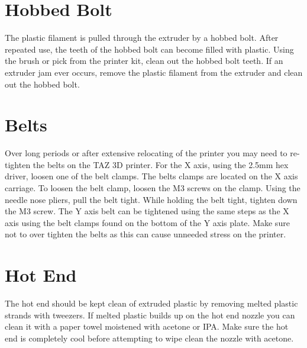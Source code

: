 \section{Hobbed Bolt}
The plastic filament is pulled through the extruder by a hobbed bolt. After repeated use, the teeth of the hobbed bolt can become filled with plastic. Using the brush or pick from the printer kit, clean out the hobbed bolt teeth. If an extruder jam ever occurs, remove the plastic filament from the extruder and clean out the hobbed bolt.

\begin{comment}
\section{Software}
\index{software}
\index{download}
LulzBot will release a new stable version of Cura LulzBot Edition, typically every quarter. It is best to update Cura every time a new version is released. The printer host and slicing software is as important as the hardware in printing quality parts. Each software update can bring advances in print quality, reliability and print times. The files are available at \texttt{http://lulzbot.com/cura}. You can also find updated software versions in the Support/Downloads section at: \texttt{http://LulzBot.com/downloads}.
\end{comment}

\section{Belts}
Over long periods or after extensive relocating of the printer you may need to re-tighten the belts on the TAZ 3D printer. For the X axis, using the 2.5mm hex driver, loosen one of the belt clamps. The belts clamps are located on the X axis carriage. To loosen the belt clamp, loosen the M3 screws on the clamp. Using the needle nose pliers, pull the belt tight. While holding the belt tight, tighten down the M3 screw. The Y axis belt can be tightened using the same steps as the X axis using the belt clamps found on the bottom of the Y axis plate. Make sure not to over tighten the belts as this can cause unneeded stress on the printer.

\section{Hot End}
The hot end should be kept clean of extruded plastic by removing melted plastic strands with tweezers. If melted plastic builds up on the hot end nozzle you can clean it with a paper towel moistened with acetone or IPA. Make sure the hot end is completely cool before attempting to wipe clean the nozzle with acetone.

